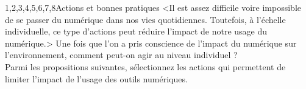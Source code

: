 \begin{quiz}[title={Numérique et environnement}]
\begin{quizquestion}[b]{1,2,3,4,5,6,7,8}{}{Actions et bonnes pratiques}
<Il est assez difficile voire impossible de se passer du numérique dans nos vies quotidiennes. Toutefois, à l'échelle individuelle, ce type d'actions peut réduire l'impact de notre usage du numérique.>
Une fois que l'on a pris conscience de l'impact du numérique sur l'environnement, comment peut-on agir au niveau individuel ?\\ Parmi les propositions suivantes, sélectionnez les actions qui permettent de limiter l'impact de l'usage des outils numériques.
\end{quizquestion}
\end{quiz}



\vfill\pagebreak\thispagestyle{empty}
